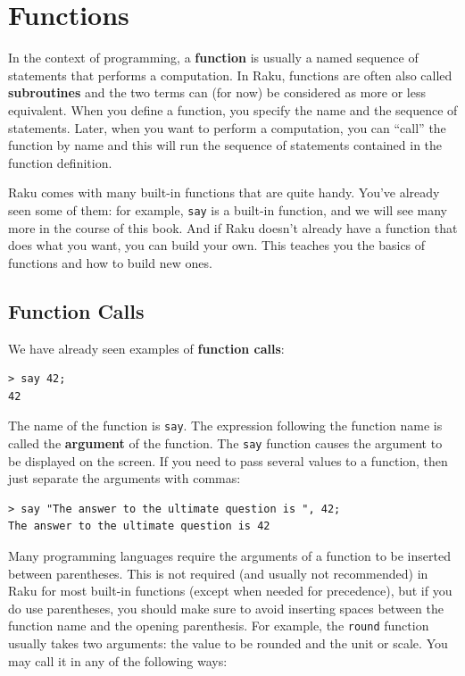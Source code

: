 \chapter{Functions}
\label{funcchap}

In the context of programming, a {\bf function} 
is usually a named sequence of statements 
that performs a computation.  In Raku, functions are often 
also called {\bf subroutines} and the two terms can (for now) 
be considered as more or less equivalent. When you define 
a function, you specify the name and the sequence of statements.  
Later, when you want to perform a computation, you can ``call'' 
the function by name and this will run the sequence of statements 
contained in the function definition.

Raku comes with many built-in functions that are quite handy.  
You've already seen some of them: for example, {\tt say} is a 
built-in function, and we will see many more in the course of 
this book. And if Raku doesn't already have a function that does 
what you want, you can build your own. This teaches you the basics 
of functions and how to build new ones.

\section{Function Calls}
\label{functionchap}

We have already seen examples of {\bf function calls}:

\begin{verbatim}
> say 42;
42
\end{verbatim}
%
The name of the function is {\tt say}.  The expression following 
the function name is called the {\bf argument} of the function. 
The {\tt say} function causes the argument to be displayed 
on the screen. If you need to pass several values to a function, 
then just separate the arguments with commas:
\begin{verbatim}
> say "The answer to the ultimate question is ", 42;
The answer to the ultimate question is 42
\end{verbatim}
%

Many programming languages require the arguments of a function to 
be inserted between parentheses. This is not required (and 
usually not recommended) in Raku for most built-in functions 
(except when needed for precedence), but if you do use 
parentheses, you should make sure to avoid inserting spaces 
between the function name and the opening parenthesis. 
For example, the {\tt round} function usually takes two 
arguments: the value to be rounded and the unit or scale. 
You may call it in any of the following ways:

